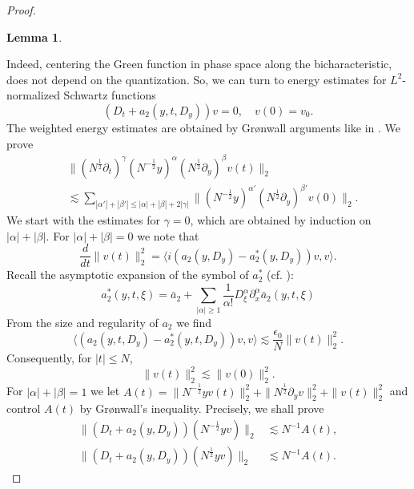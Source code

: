 \documentclass{amsart}
\numberwithin{equation}{section}
\newtheorem{lemma}[theorem]{Lemma}
\theoremstyle{definition}
\begin{document}
\begin{proof}
\begin{lemma}
\begin{equation*}
    \end{equation*}
\end{lemma}
Indeed, centering the Green function in phase space along the bicharacteristic, does not depend on the quantization. So, we can turn to energy estimates for $L^2$-normalized Schwartz functions
\begin{equation*}
    (D_t + a_2(y,t,D_y))v = 0, \quad v(0) = v_0.
\end{equation*}
The weighted energy estimates are obtained by Gr\o nwall arguments like in \cite{SchippaTataru2025}. 
We prove
\begin{align*}
&\| (N^{\frac{1}{2}} \partial_t )^{\gamma} (N^{-\frac{1}{2}} y)^{\alpha} (N^{\frac{1}{2}} \partial_y)^{\beta} v(t) \|_2\\
&\lesssim \sum_{|\alpha'|+|\beta'| \leq |\alpha| + |\beta| + 2 |\gamma|} \| (N^{-\frac{1}{2}} y)^{\alpha'} (N^{\frac{1}{2}} \partial_y)^{\beta'} v(0) \|_2.
\end{align*}
We start with the estimates for $\gamma = 0$, which are obtained by induction on $|\alpha| + |\beta| $. For $|\alpha| + |\beta| = 0$ we note that
\begin{equation*}
    \frac{d}{dt} \|v(t) \|_2^2 = \langle i (a_2(y,D_y) - a_2^*(y,D_y) ) v, v \rangle.
\end{equation*}
Recall the asymptotic expansion of the symbol of $a_2^*$ (cf. \cite[Theorem~3.13]{Sogge2017}):
\begin{equation*}
    a_2^*(y,t,\xi) = \bar{a}_2 + \sum_{|\alpha| \geq 1} \frac{1}{\alpha!} D_{\xi}^{\alpha} \partial_x^{\alpha} \bar{a}_2(y,t,\xi)
\end{equation*}
From the size and regularity of $a_2$ we find
\begin{equation*}
    \langle (a_2(y,t,D_y) - a_2^*(y,t,D_y))v, v \rangle \lesssim \frac{\epsilon_0}{N} \| v(t) \|_2^2.
\end{equation*}
Consequently, for $|t| \leq N$,
\begin{equation*}
    \| v(t) \|_2^2 \lesssim \| v(0) \|_2^2.
\end{equation*}
For $|\alpha| + |\beta| = 1$ we let $A(t) = \| N^{-\frac{1}{2}} yv(t) \|_2^2 + \| N^{\frac{1}{2}} \partial_y v \|_2^2 + \| v(t) \|_2^2$ and control $A(t)$ by Gr\o nwall's inequality. Precisely, we shall prove
\begin{align}
\label{eq:EnergyEstimateA} \| (D_t + a_2(y,D_y)) (N^{-\frac{1}{2}} y v) \|_2 &\lesssim N^{-1} A(t),  \\
\label{eq:EnergyEstimateB} \| (D_t + a_2(y,D_y)) (N^{\frac{1}{2}} y v) \|_2 &\lesssim N^{-1} A(t).

\end{align}
\end{proof}
\end{document}
